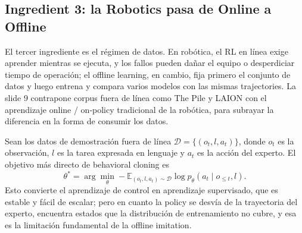 

\subsection{Ingredient 3: la Robotics pasa de Online a Offline}

El tercer ingrediente es el régimen de datos. En robótica, el RL en línea exige aprender mientras se ejecuta, y los fallos pueden dañar el equipo o desperdiciar tiempo de operación; el offline learning, en cambio, fija primero el conjunto de datos y luego entrena y compara varios modelos con las mismas trajectories. La slide 9 contrapone corpus fuera de línea como The Pile y LAION con el aprendizaje online / on-policy tradicional de la robótica, para subrayar la diferencia en la forma de consumir los datos.


Sean los datos de demostración fuera de línea $\mathcal{D}=\{(o_t,l,a_t)\}$, donde $o_t$ es la observación, $l$ es la tarea expresada en lenguaje y $a_t$ es la acción del experto. El objetivo más directo de behavioral cloning es
\begin{equation}
\theta^*=\arg\min_{\theta}
-\mathbb{E}_{(o_t,l,a_t)\sim\mathcal{D}}
\log p_{\theta}(a_t\mid o_{\le t},l).
\end{equation}
Esto convierte el aprendizaje de control en aprendizaje supervisado, que es estable y fácil de escalar; pero en cuanto la policy se desvía de la trayectoria del experto, encuentra estados que la distribución de entrenamiento no cubre, y esa es la limitación fundamental de la offline imitation.


